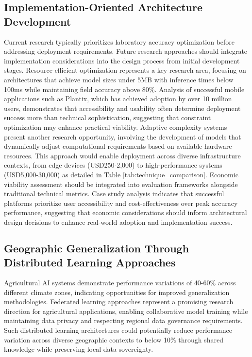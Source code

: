 \documentclass[sn-mathphys]{sn-jnl}
\theoremstyle{thmstyleone}%
\theoremstyle{thmstyletwo}%
\theoremstyle{thmstylethree}%
\begin{document}
\subsection{Implementation-Oriented Architecture Development}
Current research typically prioritizes laboratory accuracy optimization before addressing deployment requirements. Future research approaches should integrate implementation considerations into the design process from initial development stages. Resource-efficient optimization represents a key research area, focusing on architectures that achieve model sizes under 5MB with inference times below 100ms while maintaining field accuracy above 80\%. Analysis of successful mobile applications such as Plantix, which has achieved adoption by over 10 million users, demonstrates that accessibility and usability often determine deployment success more than technical sophistication, suggesting that constraint optimization may enhance practical viability. Adaptive complexity systems present another research opportunity, involving the development of models that dynamically adjust computational requirements based on available hardware resources. This approach would enable deployment across diverse infrastructure contexts, from edge devices (USD250-2,000) to high-performance systems (USD5,000-30,000) as detailed in Table \ref{tab:technique_comparison}. Economic viability assessment should be integrated into evaluation frameworks alongside traditional technical metrics. Case study analysis indicates that successful platforms prioritize user accessibility and cost-effectiveness over peak accuracy performance, suggesting that economic considerations should inform architectural design decisions to enhance real-world adoption and implementation success.

\subsection{Geographic Generalization Through Distributed Learning Approaches}
Agricultural AI systems demonstrate performance variations of 40-60\% across different climate zones, indicating opportunities for improved generalization methodologies. Federated learning approaches represent a promising research direction for agricultural applications, enabling collaborative model training while maintaining data privacy and respecting regional data governance requirements. Such distributed learning architectures could potentially reduce performance variation across diverse geographic contexts to below 10\% through shared knowledge while preserving local data sovereignty.
\end{document}
